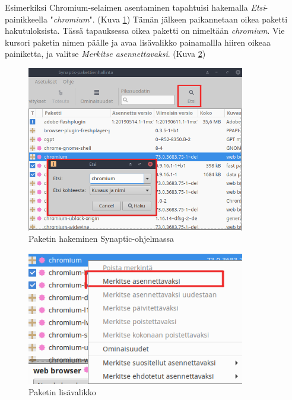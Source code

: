 \documentclass[a4paper, 12pt, finnish]{article}
\begin{document}
Esimerkiksi Chromium-selaimen asentaminen tapahtuisi hakemalla \textit{Etsi}-painikkeella "\textit{chromium}". (Kuva \ref{fig:chro_haku})
Tämän jälkeen paikannetaan oikea paketti hakutuloksista. Tässä tapauksessa oikea paketti on nimeltään \textit{chromium}. Vie kursori paketin nimen päälle ja avaa lisävalikko painamallla hiiren oikeaa painiketta, ja valitse \textit{Merkitse asennettavaksi}. (Kuva \ref{fig:chro_menu})

\begin{figure}[htpb]
    \begin{center}
        \includegraphics[width=0.85\textwidth]{ymparisto/chro_haku}
        \caption{Paketin hakeminen Synaptic-ohjelmassa}
        \label{fig:chro_haku}
    \end{center}
\end{figure}

\begin{figure}[htpb]
    \begin{center}
        \includegraphics[width=0.85\textwidth]{ymparisto/chro_menu}
        \caption{Paketin lisävalikko}
        \label{fig:chro_menu}
    \end{center}
\end{figure}
\clearpage
\end{document}
